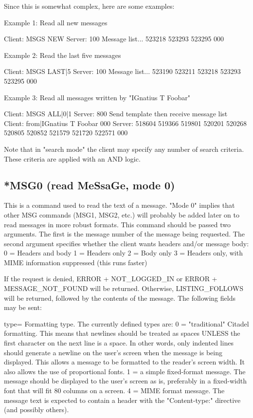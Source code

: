  Since this is somewhat complex, here are some examples:

 Example 1: Read all new messages

 Client:   MSGS NEW
 Server:   100 Message list...
           523218
           523293
           523295
           000

 Example 2: Read the last five messages

 Client:   MSGS LAST|5
 Server:   100 Message list...
           523190
           523211
           523218
           523293
           523295
           000

 Example 3: Read all messages written by "IGnatius T Foobar"

 Client:   MSGS ALL|0|1
 Server:   800 Send template then receive message list
 Client:   from|IGnatius T Foobar
           000
 Server:   518604
           519366
           519801
           520201
           520268
           520805
           520852
           521579
           521720
           522571
           000

 Note that in "search mode" the client may specify any number of search
criteria.  These criteria are applied with an AND logic.



\subsection{*MSG0 (read MeSsaGe, mode 0)}

 This is a command used to read the text of a message.  "Mode 0" implies that
other MSG commands (MSG1, MSG2, etc.) will probably be added later on to read
messages in more robust formats.  This command should be passed two arguments.
The first is the message number of the message being requested.  The second
argument specifies whether the client wants headers and/or message body:
 0 = Headers and body
 1 = Headers only
 2 = Body only
 3 = Headers only, with MIME information suppressed (this runs faster)

 If the request is denied, ERROR + NOT_LOGGED_IN or ERROR + MESSAGE_NOT_FOUND
will be returned.  Otherwise, LISTING_FOLLOWS will be returned, followed by
the contents of the message.  The following fields may be sent:

 type=   Formatting type.  The currently defined types are:
  0 = "traditional" Citadel formatting.  This means that newlines should be
treated as spaces UNLESS the first character on the next line is a space.  In
other words, only indented lines should generate a newline on the user's screen
when the message is being displayed.  This allows a message to be formatted to
the reader's screen width.  It also allows the use of proportional fonts.
  1 = a simple fixed-format message.  The message should be displayed to
the user's screen as is, preferably in a fixed-width font that will fit 80
columns on a screen.
  4 = MIME format message.  The message text is expected to contain a header
with the "Content-type:" directive (and possibly others).

